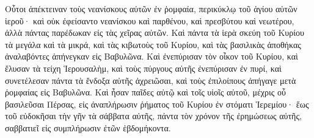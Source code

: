 {Οὗτοι ἀπέκτειναν τοὺς νεανίσκους αὐτῶν ἐν ῥομφαία, περικύκλῳ τοῦ ἁγίου αὐτῶν ἱεροῦ· καὶ οὐκ ἐφείσαντο νεανίσκου καὶ παρθένου, καὶ πρεσβύτου καὶ νεωτέρου, ἀλλὰ πάντας παρέδωκαν εἰς τὰς χεῖρας αὐτῶν.
Καὶ πάντα τὰ ἱερὰ σκεύη τοῦ Κυρίου τὰ μεγάλα καὶ τὰ μικρά, καὶ τὰς κιβωτοὺς τοῦ Κυρίου, καὶ τὰς βασιλικὰς ἀποθήκας ἀναλαβόντες ἀπήνεγκαν εἰς Βαβυλῶνα.
Καὶ ἐνεπύρισαν τὸν οἶκον τοῦ Κυρίου, καὶ ἔλυσαν τὰ τείχη Ἱερουσαλὴμ, καὶ τοὺς πύργους αὐτῆς ἐνεπύρισαν ἐν πυρί,
καὶ συνετέλεσαν πάντα τὰ ἔνδοξα αὐτῆς ἀχρειῶσαι, καὶ τοὺς ἐπιλοίπους ἀπήγαγε μετὰ ῥομφαίας εἰς Βαβυλῶνα.
Καὶ ἦσαν παῖδες αὐτῷ καὶ τοῖς υἱοῖς αὐτοῦ, μέχρις οὗ βασιλεῦσαι Πέρσας, εἰς ἀναπλήρωσιν ῥήματος τοῦ Κυρίου ἐν στόματι Ἱερεμίου·
ἕως τοῦ εὐδοκῆσαι τὴν γῆν τὰ σάββατα αὐτῆς, πάντα τὸν χρόνον τῆς ἐρημώσεως αὐτῆς, σαββατιεῖ εἰς συμπλήρωσιν ἐτῶν ἑβδομήκοντα.

}

